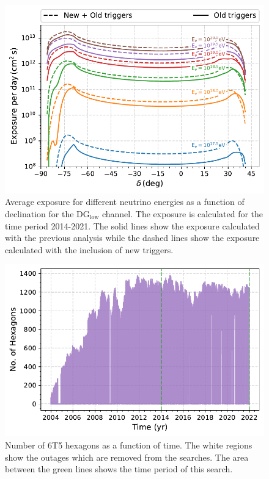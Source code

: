 \begin{figure}[t!]
  \centering
  \includegraphics[width=\textwidth]{thesis_figures/PointLimits/Exposure_vs_Dec.pdf}
  \caption{Average exposure for different neutrino energies as a function of declination for the DG$\mathrm{_{\text{low}}}$ channel. The exposure is calculated for the time period 2014-2021. The solid lines show the exposure calculated with the previous analysis while the dashed lines show the exposure calculated with the inclusion of new triggers.}
  \label{fig:Exp_dec}
\end{figure}

\begin{figure}[t!]
  \centering
  \includegraphics[width=\textwidth]{thesis_figures/PointLimits/Hexagons_2004_2021_forSrijan.pdf}
  \caption{Number of 6T5 hexagons as a function of time. The white regions show the outages which are removed from the searches. The area between the green lines shows the time period of this search.}
  \label{fig:Hexagon_time}
\end{figure}

